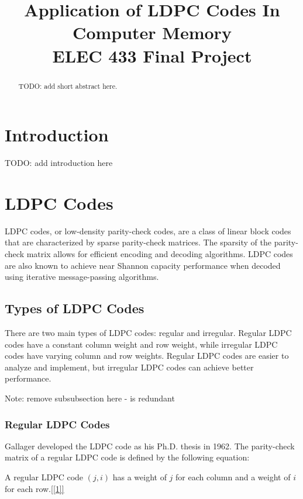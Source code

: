\documentclass[conference]{IEEEtran}
\begin{document}
\title{Application of LDPC Codes In Computer Memory\\
{\large ELEC 433 Final Project}
}

\author{
\and
{}
}

\maketitle

\begin{abstract}
  TODO: add short abstract here.
\end{abstract}

\section{Introduction}
TODO: add introduction here

\section{LDPC Codes}
LDPC codes, or low-density parity-check codes, are a class of linear block codes that are characterized by sparse parity-check matrices.
The sparsity of the parity-check matrix allows for efficient encoding and decoding algorithms.
LDPC codes are also known to achieve near Shannon capacity performance when decoded using iterative message-passing algorithms.

\subsection{Types of LDPC Codes}
There are two main types of LDPC codes: regular and irregular.
Regular LDPC codes have a constant column weight and row weight, while irregular LDPC codes have varying column and row weights.
Regular LDPC codes are easier to analyze and implement, but irregular LDPC codes can achieve better performance.

Note: remove subsubsection here - is redundant

\subsubsection{Regular LDPC Codes}
Gallager developed the LDPC code as his Ph.D. thesis in 1962.
The parity-check matrix of a regular LDPC code is defined by the following equation:

A regular LDPC code $(j,i)$ has a weight of $j$ for each column and a weight of $i$ for each row.\ref{[1]}
\end{document}
